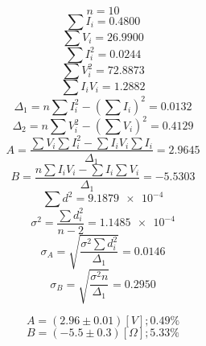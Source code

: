 \documentclass[letter,11pt]{article}
\begin{document}
\begin{enumerate}
    \begin{equation*}
        n = 10
    \end{equation*}
    \begin{equation*}
        \sum I_i = 0.4800
    \end{equation*}
    \begin{equation*}
        \sum V_i = 26.9900
    \end{equation*}
    \begin{equation*}
        \sum I^2_i = 0.0244
    \end{equation*}
    \begin{equation*}
        \sum V^2_i = 72.8873
    \end{equation*}
    \begin{equation*}
        \sum I_i V_i = 1.2882
    \end{equation*}
    \begin{equation*}
        \Delta_1 = n \sum I^2_i - \left( \sum I_i \right)^2 = 0.0132
    \end{equation*}
    \begin{equation*}
        \Delta_2 = n \sum V^2_i - \left( \sum V_i \right)^2 = 0.4129
    \end{equation*}
    \begin{equation*}
        A = \frac{\sum V_i \sum I^2_i - \sum I_i V_i \sum I_i}{\Delta_1} = 2.9645
    \end{equation*}
    \begin{equation*}
        B = \frac{n \sum I_i V_i - \sum I_i \sum V_i}{\Delta_1} = -5.5303
    \end{equation*}
    \begin{equation*}
        \sum d^2 = \num{9.1879e-4}
    \end{equation*}
    \begin{equation*}
        \sigma^2 = \frac{\sum d^2_i}{n-2} = \num{1.1485e-4}
    \end{equation*}
    \begin{equation*}
        \sigma_A = \sqrt{\frac{\sigma^2 \sum d^2_i}{\Delta_1}} = 0.0146
    \end{equation*}
    \begin{equation*}
        \sigma_B = \sqrt{\frac{\sigma^2 n}{\Delta_1}} = 0.2950
    \end{equation*}

    \begin{equation*}
        A = (2.96 \pm 0.01)[V]; 0.49 \%
    \end{equation*}
    \begin{equation*}
        B = (-5.5 \pm 0.3)[\Omega]; 5.33 \%
    \end{equation*}


\end{enumerate}
\end{document}
